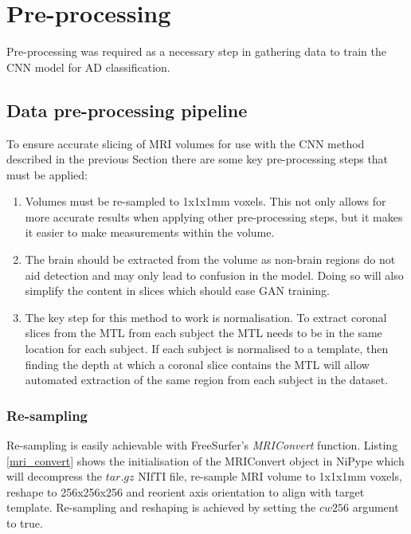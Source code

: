 \documentclass[
    author={Kai Hulme},
    supervisor={Dr Jon Bird},
    degree={BSc},
    title={Generative Adversarial Networks as an Augmentation Technique},
    subtitle={for Alzheimer's Disease Detection in MRI Volumes},
    type={Research},
    year={2021} 
]{dissertation}
\begin{document}
	
\section{Pre-processing}

Pre-processing was required as a necessary step in gathering data to train the CNN model for AD classification.

\subsection{Data pre-processing pipeline}

To ensure accurate slicing of MRI volumes for use with the CNN method described in the previous Section there are some key pre-processing steps that must be applied:

\begin{enumerate}
    \item Volumes must be re-sampled to 1x1x1mm voxels. This not only allows for more accurate results when applying other pre-processing steps, but it makes it easier to make measurements within the volume.
    \item The brain should be extracted from the volume as non-brain regions do not aid detection and may only lead to confusion in the model. Doing so will also simplify the content in slices which should ease GAN training.
    \item The key step for this method to work is normalisation. To extract coronal slices from the MTL from each subject the MTL needs to be in the same location for each subject. If each subject is normalised to a template, then finding the depth at which a coronal slice contains the MTL will allow automated extraction of the same region from each subject in the dataset.
\end{enumerate}


\subsubsection{Re-sampling}

Re-sampling is easily achievable with FreeSurfer's \textit{MRIConvert} function. Listing \ref{mri_convert} shows the initialisation of the MRIConvert object in NiPype which will decompress the $tar.gz$ NIfTI file, re-sample MRI volume to 1x1x1mm voxels, reshape to 256x256x256 and reorient axis orientation to align with target template. Re-sampling and reshaping is achieved by setting the $cw256$ argument to true.
\end{document}
